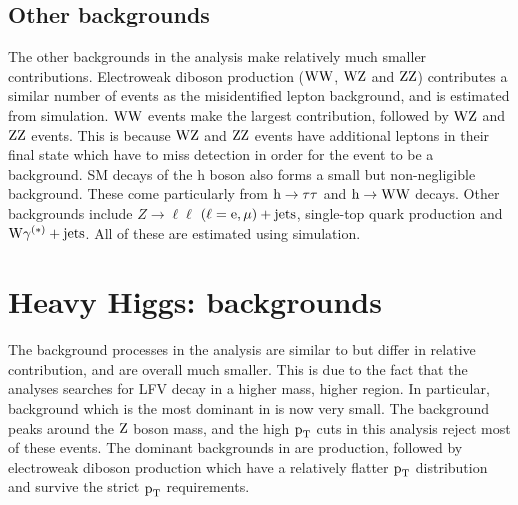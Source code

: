 \subsection{Other backgrounds}
\label{h125_other_bg}
The other backgrounds in the analysis make relatively much smaller contributions. Electroweak diboson production ($\text{W}\text{W}$, $\text{W}\text{Z}$ and $\text{Z}\text{Z}$) contributes a similar number of events as the misidentified lepton background, and is estimated from simulation. $\text{W}\text{W}$ events make the largest contribution, followed by $\text{W}\text{Z}$ and $\text{Z}\text{Z}$ events. This is because $\text{W}\text{Z}$ and $\text{Z}\text{Z}$ events  have additional leptons in their final state which have to miss detection in order for the event to be a background. SM decays of the h boson also forms a small but non-negligible background. These come particularly from $\text{h} \to \tau\tau$  and $\text{h} \to \text{W}\text{W}$ decays. Other backgrounds include $Z\to\ell\ell$ $(\ell = \text{e}, \mu)+\text{jets}$, single-top quark production and $\text{W}\gamma^{(*)}+\text{jets}$. All of these are estimated using simulation.  

\section{Heavy Higgs: \Hmue backgrounds }
\label{H_bg_val}
The background processes in the \Hmue analysis are  similar  to \hmue but differ in relative contribution, and are overall much smaller. This is due to the fact that the \Hmue analyses searches for LFV decay in a higher mass, higher \pt region. In particular, \ztt background which is the most dominant in \hmue is now very small. The \ztt background peaks around the $\text{Z}$ boson mass, and the  high $\text{p}_\text{T}$ cuts in this analysis reject most of these events. The dominant backgrounds in \Hmue are \ttb production, followed by electroweak diboson production which have a relatively flatter $\text{p}_\text{T}$ distribution and survive the strict $\text{p}_\text{T}$ requirements.

